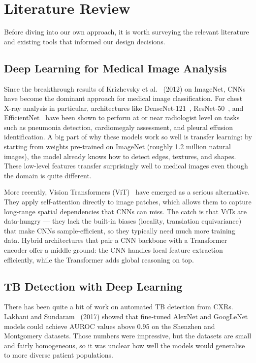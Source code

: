 \documentclass[12pt]{report}
\begin{document}
\section{Literature Review}

Before diving into our own approach, it is worth surveying the relevant literature and existing tools that informed our design decisions.

\subsection{Deep Learning for Medical Image Analysis}
Since the breakthrough results of Krizhevsky et al.~\cite{ref16} (2012) on ImageNet, CNNs have become the dominant approach for medical image classification. For chest X-ray analysis in particular, architectures like DenseNet-121~\cite{ref6}, ResNet-50~\cite{ref19}, and EfficientNet~\cite{ref7} have been shown to perform at or near radiologist level on tasks such as pneumonia detection, cardiomegaly assessment, and pleural effusion identification. A big part of why these models work so well is transfer learning: by starting from weights pre-trained on ImageNet (roughly 1.2 million natural images), the model already knows how to detect edges, textures, and shapes. These low-level features transfer surprisingly well to medical images even though the domain is quite different.

More recently, Vision Transformers (ViT)~\cite{ref8} have emerged as a serious alternative. They apply self-attention directly to image patches, which allows them to capture long-range spatial dependencies that CNNs can miss. The catch is that ViTs are data-hungry --- they lack the built-in biases (locality, translation equivariance) that make CNNs sample-efficient, so they typically need much more training data. Hybrid architectures that pair a CNN backbone with a Transformer encoder offer a middle ground: the CNN handles local feature extraction efficiently, while the Transformer adds global reasoning on top.

\subsection{TB Detection with Deep Learning}
There has been quite a bit of work on automated TB detection from CXRs. Lakhani and Sundaram~\cite{ref9} (2017) showed that fine-tuned AlexNet and GoogLeNet models could achieve AUROC values above 0.95 on the Shenzhen and Montgomery datasets. Those numbers were impressive, but the datasets are small and fairly homogeneous, so it was unclear how well the models would generalise to more diverse patient populations.
\end{document}
